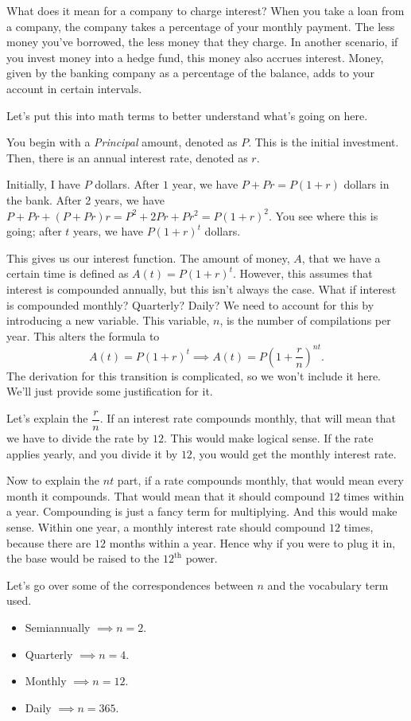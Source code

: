 \documentclass[lang=en,11pt]{elegantbook}
\begin{document}
What does it mean for a company to charge interest?  When you take a loan from a company, the company takes a percentage of your monthly payment.  The less money you've borrowed, the less money that they charge.  In another scenario, if you invest money into a hedge fund, this money also accrues interest.  Money, given by the banking company as a percentage of the balance, adds to your account in certain intervals.

Let's put this into math terms to better understand what's going on here.

You begin with a \textit{Principal} amount, denoted as $P$.  This is the initial investment.  Then, there is an annual interest rate, denoted as $r$.  

Initially, I have $P$ dollars.  After $1$ year, we have $P+Pr=P(1+r)$ dollars in the bank.  After 2 years, we have $P+Pr+(P+Pr)r=P^2+2Pr+Pr^2=P(1+r)^2.$  You see where this is going; after $t$ years, we have $P(1+r)^t$ dollars.

This gives us our interest function.  The amount of money, $A$, that we have a certain time is defined as $A(t)=P(1+r)^t$.  However, this assumes that interest is compounded annually, but this isn't always the case.  What if interest is compounded monthly? Quarterly? Daily?  We need to account for this by introducing a new variable.  This variable, $n$, is the number of compilations per year.  This alters the formula to $$A(t)=P(1+r)^t \implies A(t)=P\left(1+\dfrac{r}{n}\right)^{nt}.$$  The derivation for this transition is complicated, so we won't include it here.  We'll just provide some justification for it.

Let’s explain the $\dfrac{r}{n}$.  If an interest rate compounds monthly, that will mean that we have to divide the rate by $12$.  This would make logical sense.  If the rate applies yearly, and you divide it by $12$, you would get the monthly interest rate.  

Now to explain the $nt$ part, if a rate compounds monthly, that would mean every month it compounds.  That would mean that it should compound $12$ times within a year.  Compounding is just a fancy term for multiplying.  And this would make sense.  Within one year, a monthly interest rate should compound $12$ times, because there are $12$ months within a year.  Hence why if you were to plug it in, the base would be raised to the $12^{\text{th}}$ power.  

Let's go over some of the correspondences between $n$ and the vocabulary term used.  \begin{itemize}
    \item Semiannually $\implies n=2$.
    \item Quarterly $\implies n=4$.
    \item Monthly $\implies n=12$.
    \item Daily $\implies n=365$.
\end{itemize}
\end{document}
